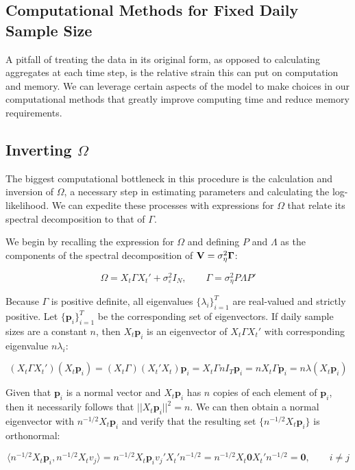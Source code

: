 \subsection{Computational Methods for Fixed Daily Sample Size}

A pitfall of treating the data in its original form, as opposed to calculating aggregates at each time step, is the relative strain this can put on computation and memory. We can leverage certain aspects of the model to make choices in our computational methods that greatly improve computing time and reduce memory requirements.

\subsection{Inverting $\Omega$}
The biggest computational bottleneck in this procedure is the calculation and inversion of $\Omega$, a necessary step in estimating parameters and calculating the log-likelihood. We can expedite these processes with expressions for $\Omega$ that relate its spectral decomposition to that of $\Gamma$.

We begin by recalling the expression for $\Omega$ and defining $P$ and $\Lambda$ as the components of the spectral decomposition of $\mathbf{V} = \sigma_\eta^2 \mathbf{\Gamma}$:

$$\Omega = X_t\Gamma X_t' + \sigma_\varepsilon^2I_N, \qquad  \Gamma = \sigma_\eta^2P \Lambda P'$$

Because $\Gamma$ is positive definite, all eigenvalues $\{\lambda_i\}_{i=1}^T$ are real-valued and strictly positive. Let $\{\mathbf{p}_i\}_{i=1}^T$ be the corresponding set of eigenvectors. If daily sample sizes are a constant $n$, then $X_t\mathbf{p}_i$ is an eigenvector of $X_t\Gamma X_t'$ with corresponding eigenvalue $n\lambda_i$:

$$ (X_t \Gamma X_t')(X_t\mathbf{p}_i) = (X_t\Gamma)(X_t'X_t)\mathbf{p}_i = X_t \Gamma n {I}_T\mathbf{p}_i = nX_t\Gamma \mathbf{p}_i = n\lambda (X_t \mathbf{p}_i) $$

Given that $\mathbf{p}_i$ is a normal vector and $X_t\mathbf{p}_i$ has $n$ copies of each element of $\mathbf{p}_i$, then it necessarily follows that $||X_t\mathbf{p}_i||^2 = n$. We can then obtain a normal eigenvector with $n^{-1/2}X_t\mathbf{p}_i$ and verify that the resulting set $\{n^{-1/2}X_t\mathbf{p}_i\}$ is orthonormal:

$$ \langle n^{-1/2}X_t\mathbf{p}_i, n^{-1/2}X_tv_j \rangle = n^{-1/2}X_t\mathbf{p}_i v_j'X_t'n^{-1/2} = n^{-1/2}X_t\mathbf{0}X_t'n^{-1/2} = \mathbf{0}, \qquad i\neq j$$

